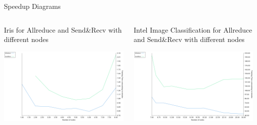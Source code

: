 \documentclass[presentation]{beamer}
\begin{document}
\begin{frame}[label={sec:orgfdf6a46}]{Speedup Diagrams}
\begin{columns}
\begin{column}{0.6\columnwidth}
\begin{block}{Iris for Allreduce and Send\&Recv with different nodes}
\begin{center}
\includegraphics[width=.9\linewidth]{./png/irisSpendup.png}
\end{center}
\end{block}
\end{column}
\begin{column}{0.6\columnwidth}
\begin{block}{Intel Image Classification for Allreduce and Send\&Recv with different nodes}
\begin{center}
\includegraphics[width=.9\linewidth]{./png/intelImageSpendup.png}
\end{center}
\end{block}
\end{column}
\end{columns}
\end{frame}
\end{document}
